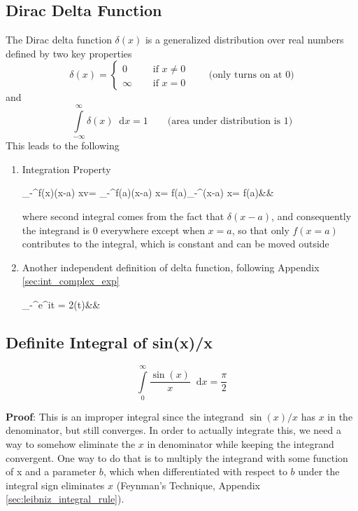 \documentclass[11pt, a4paper]{article}
\newcommand{\diff}{\mathop{}\!\mathrm{d}}
\newcommand{\dx}{\diff x}
\newcommand{\domega}{\diff \omega}
\newcommand{\dint}[2]{\int \limits_{#1}^{#2}}  %
\newcommand{\intinfty}{\dint{-\infty}{\infty}}	%
\newcommand{\intzerotoinfty}{\dint{0}{\infty}}	%
\begin{document}
\subsection{Dirac Delta Function}\label{sec:delta_func}
The Dirac delta function $\delta(x)$ is a generalized distribution over real numbers defined by two key properties \cite{dirac1981qm}
\begin{equation}\label{eq:delta_func_def}
	\delta (x) = \left\{
	\begin{array}{ll}
		0  &  \quad \text{ if } x \neq 0 \\
		\infty & \quad \text{ if } x = 0
	\end{array}
	\right. \qquad \text{(only turns on at $0$)}
\end{equation}
and
\begin{equation}\label{eq:delta_func_area}
	\intinfty \delta (x) \dx = 1 \qquad \text{(area under distribution is $1$)}
\end{equation}
This leads to the following
\begin{enumerate}
	\item Integration Property
	\begin{flalign}\label{eq:delta_func_integration_value}
		\intinfty f(x)\delta (x-a) \dx v= \intinfty f(a)\delta (x-a) \dx = f(a)\intinfty \delta (x-a) \dx = f(a)&&
	\end{flalign}
	where second integral comes from the fact that $\delta (x - a)$, and consequently the integrand is $0$ everywhere except when $x=a$, so that only $f(x=a)$ contributes to the integral, which is constant and can be moved outside
	\item Another independent definition of delta function, following Appendix \ref{sec:int_complex_exp}
	\begin{flalign}\label{eq:delta_func_def_complex_exp}
		\intinfty e^{i\omega t} \domega = 2\pi \delta (t)&&
	\end{flalign}
\end{enumerate}

\subsection{Definite Integral of sin(x)/x}\label{sec:int_sinx_by_x}
\begin{equation}\label{eq:int_sinx_by_x}
\intzerotoinfty \frac{\sin(x)}{x} \dx = \frac{\pi}{2}
\end{equation}

\vspace{4pt}
\textbf{Proof}: \cite{herman2016fourieranalysis} This is an improper integral since the integrand $\sin(x) / x$ has $x$ in the denominator, but still converges. In order to actually integrate this, we need a way to somehow eliminate the $x$ in denominator while keeping the integrand convergent. One way to do that is to multiply the integrand with some function of x and a parameter $b$, which when differentiated with respect to $b$ under the integral sign eliminates $x$ (Feynman's Technique, Appendix \ref{sec:leibniz_integral_rule}).
\end{document}
